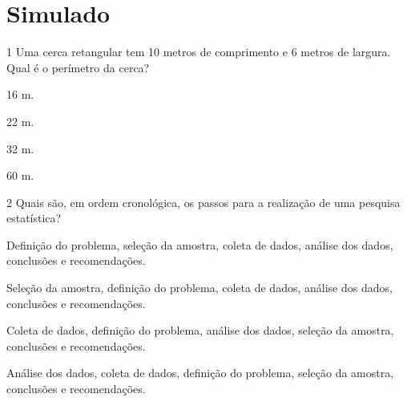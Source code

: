 





\chapter[Simulado 4]{Simulado}

\num{1} Uma cerca retangular tem 10 metros de comprimento e 6 metros de
largura. Qual é o perímetro da cerca?

\begin{escolha}
\item 16 m.
\item 22 m.
\item 32 m.
\item 60 m.
\end{escolha}







\num{2} Quais são, em ordem cronológica, os passos para a realização
de uma pesquisa estatística?

\begin{escolha}
\item Definição do problema, seleção da amostra, coleta de dados, análise
dos dados, conclusões e recomendações.
\item Seleção da amostra, definição do problema, coleta de dados, análise
dos dados, conclusões e recomendações.
\item Coleta de dados, definição do problema, análise dos dados, seleção da
amostra, conclusões e recomendações.
\item Análise dos dados, coleta de dados, definição do problema, seleção da
amostra, conclusões e recomendações.
\end{escolha}

